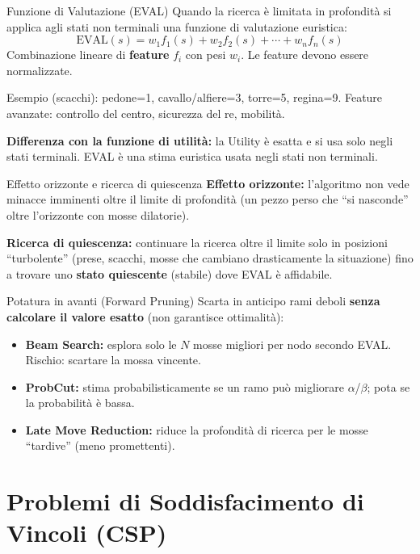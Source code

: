 \documentclass[12pt,a4paper]{article}
\begin{document}
\begin{defbox}{Funzione di Valutazione (EVAL)}
Quando la ricerca è limitata in profondità si applica agli stati non terminali una funzione di valutazione euristica:
\[
\text{EVAL}(s) = w_1 f_1(s) + w_2 f_2(s) + \cdots + w_n f_n(s)
\]
Combinazione lineare di \textbf{feature} $f_i$ con pesi $w_i$. Le feature devono essere normalizzate.

Esempio (scacchi): pedone=1, cavallo/alfiere=3, torre=5, regina=9. Feature avanzate: controllo del centro, sicurezza del re, mobilità.

\textbf{Differenza con la funzione di utilità:} la Utility è esatta e si usa solo negli stati terminali. EVAL è una stima euristica usata negli stati non terminali.
\end{defbox}

\begin{warnbox}{Effetto orizzonte e ricerca di quiescenza}
\textbf{Effetto orizzonte:} l'algoritmo non vede minacce imminenti oltre il limite di profondità (un pezzo perso che ``si nasconde'' oltre l'orizzonte con mosse dilatorie).

\textbf{Ricerca di quiescenza:} continuare la ricerca oltre il limite solo in posizioni ``turbolente'' (prese, scacchi, mosse che cambiano drasticamente la situazione) fino a trovare uno \textbf{stato quiescente} (stabile) dove EVAL è affidabile.
\end{warnbox}

\begin{defbox}{Potatura in avanti (Forward Pruning)}
Scarta in anticipo rami deboli \textbf{senza calcolare il valore esatto} (non garantisce ottimalità):
\begin{itemize}[noitemsep]
  \item \textbf{Beam Search:} esplora solo le $N$ mosse migliori per nodo secondo EVAL. Rischio: scartare la mossa vincente.
  \item \textbf{ProbCut:} stima probabilisticamente se un ramo può migliorare $\alpha$/$\beta$; pota se la probabilità è bassa.
  \item \textbf{Late Move Reduction:} riduce la profondità di ricerca per le mosse ``tardive'' (meno promettenti).
\end{itemize}
\end{defbox}

\section{Problemi di Soddisfacimento di Vincoli (CSP)}
\end{document}
